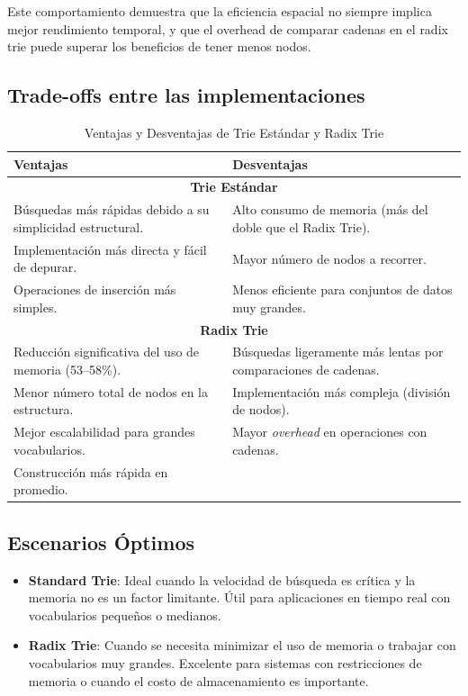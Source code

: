 \documentclass[11pt,a4paper]{article}
\begin{document}
Este comportamiento demuestra que la eficiencia espacial no siempre implica mejor rendimiento temporal, y que el overhead de comparar cadenas en el radix trie puede superar los beneficios de tener menos nodos.

\subsection{Trade-offs entre las implementaciones}

\begin{table}[H]
\centering
\caption{Ventajas y Desventajas de Trie Estándar y Radix Trie}
\label{tab:ventajas_desventajas}
\begin{tabular}{|p{6.5cm}|p{6.5cm}|}
\hline
\textbf{Ventajas} & \textbf{Desventajas} \\
\hline
\multicolumn{2}{|c|}{\textbf{Trie Estándar}} \\
\hline
Búsquedas más rápidas debido a su simplicidad estructural. &
Alto consumo de memoria (más del doble que el Radix Trie). \\
Implementación más directa y fácil de depurar. &
Mayor número de nodos a recorrer. \\
Operaciones de inserción más simples. &
Menos eficiente para conjuntos de datos muy grandes. \\
\hline
\multicolumn{2}{|c|}{\textbf{Radix Trie}} \\
\hline
Reducción significativa del uso de memoria (53–58\%). &
Búsquedas ligeramente más lentas por comparaciones de cadenas. \\
Menor número total de nodos en la estructura. &
Implementación más compleja (división de nodos). \\
Mejor escalabilidad para grandes vocabularios. &
Mayor \emph{overhead} en operaciones con cadenas. \\
Construcción más rápida en promedio. & \\
\hline
\end{tabular}
\end{table}



\subsection{Escenarios Óptimos}

\begin{itemize}
    \item \textbf{Standard Trie}: Ideal cuando la velocidad de búsqueda es crítica y la memoria no es un factor limitante. Útil para aplicaciones en tiempo real con vocabularios pequeños o medianos.
    
    \item \textbf{Radix Trie}: Cuando se necesita minimizar el uso de memoria o trabajar con vocabularios muy grandes. Excelente para sistemas con restricciones de memoria o cuando el costo de almacenamiento es importante.
\end{itemize}
\end{document}
